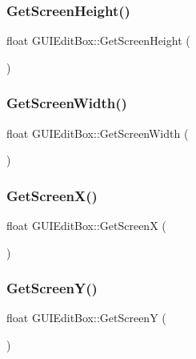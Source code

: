 \subsubsection{\texorpdfstring{Get\+Screen\+Height()}{GetScreenHeight()}}
{\footnotesize\ttfamily float G\+U\+I\+Edit\+Box\+::\+Get\+Screen\+Height (\begin{DoxyParamCaption}{ }\end{DoxyParamCaption})}

\hypertarget{class_g_u_i_edit_box_a9e16103494ffe2213cb73340f2efd537}{}\label{class_g_u_i_edit_box_a9e16103494ffe2213cb73340f2efd537} 
\subsubsection{\texorpdfstring{Get\+Screen\+Width()}{GetScreenWidth()}}
{\footnotesize\ttfamily float G\+U\+I\+Edit\+Box\+::\+Get\+Screen\+Width (\begin{DoxyParamCaption}{ }\end{DoxyParamCaption})}

\hypertarget{class_g_u_i_edit_box_a083c42a34076f31398a5bbb569593ed5}{}\label{class_g_u_i_edit_box_a083c42a34076f31398a5bbb569593ed5} 
\subsubsection{\texorpdfstring{Get\+Screen\+X()}{GetScreenX()}}
{\footnotesize\ttfamily float G\+U\+I\+Edit\+Box\+::\+Get\+ScreenX (\begin{DoxyParamCaption}{ }\end{DoxyParamCaption})}

\hypertarget{class_g_u_i_edit_box_af785fc3daf602a651da0e158033d8b96}{}\label{class_g_u_i_edit_box_af785fc3daf602a651da0e158033d8b96} 
\subsubsection{\texorpdfstring{Get\+Screen\+Y()}{GetScreenY()}}
{\footnotesize\ttfamily float G\+U\+I\+Edit\+Box\+::\+Get\+ScreenY (\begin{DoxyParamCaption}{ }\end{DoxyParamCaption})}

